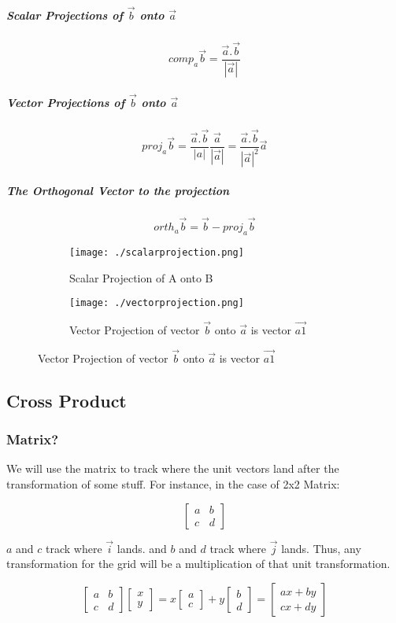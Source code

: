 \documentclass{article}
\begin{document}
\subparagraph{Scalar Projections of $ \vec{b}$ onto $ \vec{a}$}
\[comp_a \vec{b} = \frac{ \vec{a} . \vec{b}}{|\vec{a}|}	\]
\subparagraph{Vector Projections of $ \vec{b}$ onto $ \vec{a}$}
\[
	proj_a \vec{b} = 	\frac{ \vec{a} . \vec{b} }{|a|}	 \frac{ \vec{a} }{ |\vec{a}| } = \frac{ \vec{a} . \vec{b} }{| \vec{a} |^2} \vec{a}
\]
\subparagraph{The Orthogonal Vector to the projection}
\[
	orth_a \vec{ b } = \vec{ b } - proj_a \vec{ b }
\]
\begin{figure}[h!]
	\begin{subfigure}{0.5\linewidth}
		\texttt{[image: ./scalarprojection.png]}
		\caption{Scalar Projection of A onto B}
	\end{subfigure} \qquad
	\begin{subfigure}{0.5\linewidth}
		\texttt{[image: ./vectorprojection.png]}
		\caption{Vector Projection of vector $ \vec{b}$ onto $ \vec{a}$ is vector $ \vec{a1}$}
	\end{subfigure}
\end{figure}

\newpage

\subsection{Cross Product}

\subsubsection{Matrix?}
We will use the matrix to track where the unit vectors land after the transformation of some stuff. For instance, in the case of 2x2 Matrix:

\[
	\left [
		\begin{matrix}
			a & b\\
			c & d
		\end{matrix} 
		\right ]
\]

$ a $ and $ c $ track where $ \vec{ i } $ lands. and $ b $ and $ d $ track where $ \vec{ j } $ lands. Thus, any transformation for the grid will be a multiplication of that unit transformation.

\[
	\left [
		\begin{matrix}
			a & b\\
			c & d
		\end{matrix} 
		\right ]
	\left [
		\begin{matrix}
			x \\
			y	
		\end{matrix}
		\right ]
	=
	x \left [
		\begin{matrix}
			a \\ c
		\end{matrix}
		\right]
	+ y \left [
		\begin{matrix}
			b \\ d
		\end{matrix}
		\right]
	= \left [
		\begin{matrix}
			a x + b y \\ c x + d y 
		\end{matrix}
		\right]
\]
\end{document}
